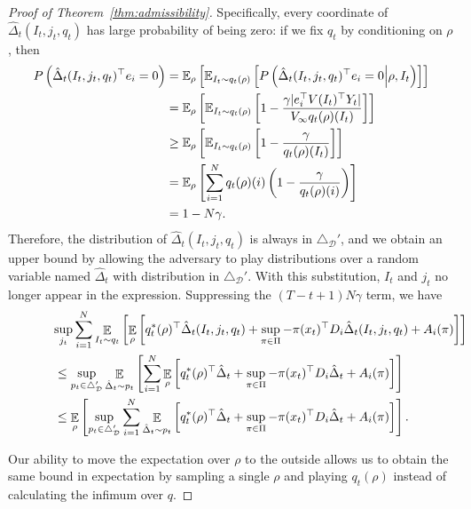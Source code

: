 \documentclass{article}
\begin{document}
\begin{proof}[Proof of Theorem~\ref{thm:admissibility}]
Specifically, every coordinate of $\hat\Delta_t(I_t,j_t,q_t)$  has large probability of being zero: if we fix $q_t$ by conditioning on $\rho$, then
\begin{align*}
  P\left(\hat\Delta_t(I_t,j_t,q_t)^\top e_i = 0 \right)
  &=
    \mathbb E_{\rho}\left[ \mathbb E_{I_t \sim q_t(\rho)}\left[ P\left(\hat\Delta_t(I_t,j_t,q_t)^\top e_i = 0 \middle |\rho, I_t\right)\right]\right]\\
    &=
    \mathbb E_{\rho}\left[ \mathbb E_{I_t \sim q_t(\rho)}\left[
    1-\frac{\gamma \vert e_i^\top V(I_t)^\top Y_t\vert }{V_\infty q_t(\rho)(I_t)}
    \right]\right]\\
  &\geq
    \mathbb E_{\rho}\left[ \mathbb E_{I_t \sim q_t(\rho)}\left[
    1-\frac{\gamma}{q_t(\rho)(I_t)}
    \right]\right]\\
  &= \mathbb E_{\rho}\left[
    \sum_{i=1}^N q_t(\rho)(i) \left(1- \frac{\gamma}{q_t(\rho)(i)}\right)\right]\\
  &= 1 - N \gamma.
\end{align*}
Therefore, the distribution of $\hat\Delta_t(I_t,j_t,q_t)$ is always in $\triangle_{\mathcal D}'$, and we obtain an upper bound by allowing the adversary to play distributions over a random variable named $\hat\Delta_t$ with distribution in $\triangle_{\mathcal D}'$. With this substitution, $I_t$ and $j_t$ no longer appear in the expression. Suppressing the $(T-t+1)N\gamma$ term, we have
\begin{align*}
  &\lefteqn{
        \sup_{j_t } \sum_{i=1}^N\mathop{\ex}_{I_t\sim q_t}\left[\mathop{\ex}_{\rho}\left[ q_t^*(\rho)^\top \hat \Delta_t(I_t,j_t,q_t)
    +
    \sup_{\pi\in\Pi} -\pi(x_t)^\top D_i\hat\Delta_t(I_t,j_t,q_t) + A_i(\pi)\right]\right]
    }\\
  &\leq
    \sup_{p_t\in\triangle_{\mathcal D}'} \mathop{\ex}_{\hat\Delta_t\sim p_t}\left[
    \sum_{i=1}^N\mathop{\ex}_{\rho}\left[ q_t^*(\rho)^\top \hat \Delta_t
    +
    \sup_{\pi\in\Pi} -\pi(x_t)^\top D_i\hat\Delta_t + A_i(\pi)\right]\right]\\
    &\leq
\mathop{\ex}_{\rho}\left[ \sup_{p_t\in\triangle_{\mathcal D}'}\sum_{i=1}^N \mathop{\ex}_{\hat\Delta_t\sim p_t}\left[ q_t^*(\rho)^\top \hat \Delta_t
    +
  \sup_{\pi\in\Pi} -\pi(x_t)^\top D_i\hat\Delta_t + A_i(\pi)\right]\right].
\end{align*}

Our ability to move the expectation over $\rho$ to the outside allows us to obtain the same bound in expectation by sampling a single $\rho$ and playing $q_t(\rho)$ instead of calculating the infimum over $q$. 


\end{proof}
\end{document}
